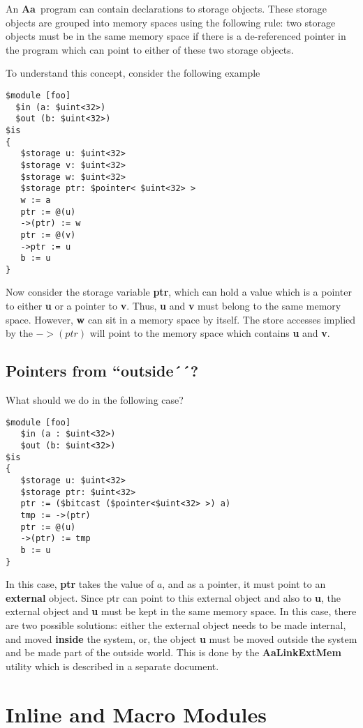 \documentclass{article}
\newcommand{\Aa}{{\bf Aa}~}
\begin{document}
An \Aa program can contain declarations to storage objects.  These
storage objects are grouped into memory spaces using
the following rule: two storage objects must be in the same
memory space if there is a de-referenced pointer in the
program which can point to either of these two storage objects.

To understand this concept, consider the following
example
\begin{verbatim}
$module [foo] 
  $in (a: $uint<32>)
  $out (b: $uint<32>) 
$is
{
   $storage u: $uint<32>
   $storage v: $uint<32>
   $storage w: $uint<32>
   $storage ptr: $pointer< $uint<32> >
   w := a
   ptr := @(u)
   ->(ptr) := w
   ptr := @(v)
   ->ptr := u
   b := u
}
\end{verbatim}
Now consider the storage variable {\bf ptr}, which can hold a value which
is a pointer to either {\bf u} or a pointer to {\bf v}.  Thus,
{\bf u} and {\bf v} must belong to the same memory space.
However, {\bf w} can sit in a memory space by itself.  The
store accesses implied by the $->(ptr)$ will point to the
memory space which contains {\bf u} and {\bf v}.


\subsection{Pointers from ``outside´´? }

What should we do in the following case?
\begin{verbatim}
$module [foo]
   $in (a : $uint<32>)
   $out (b: $uint<32>)
$is
{
   $storage u: $uint<32> 
   $storage ptr: $uint<32>
   ptr := ($bitcast ($pointer<$uint<32> >) a)
   tmp := ->(ptr)
   ptr := @(u)
   ->(ptr) := tmp
   b := u
}
\end{verbatim}
In this case, {\bf ptr} takes the value of $a$,
and as a pointer, it must point to 
an {\bf external} object.  Since ptr can 
point to this external object and also to {\bf u},
the external object and {\bf u} must be kept in
the same memory space.  In this case, there
are two possible solutions: either the external
object needs
to be made internal, and moved {\bf inside} the system,
or, the object {\bf u} must be moved outside the system
and be made part of the outside world.
This is done by the {\bf AaLinkExtMem} utility
which is described in a separate document.


\section{Inline and Macro Modules}
\end{document}

